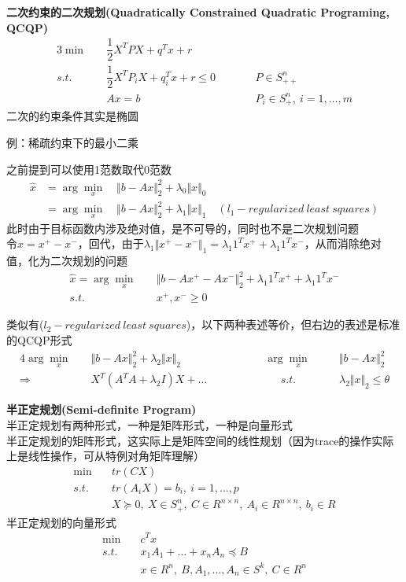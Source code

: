 \documentclass[11pt]{ctexart}         %
\newcommand{\rebacklinespread}[1][-12pt]{\vspace{#1}}
\newcommand{\oneline}[1][12pt]{\vspace{#1}}
\newcommand{\rs}[2][R]{#1^{#2}} %
\newcommand{\ba}[1]{\begin{align*}#1\end{align*}}
\newcommand{\li}[3][例]{
	#1：#2\\ 
	\phantom{#1：}\begin{minipage}[t]{0.9\linewidth}%
	\setlength\parskip{12pt}
	#3
	\end{minipage}
	\oneline}
\begin{document}
\textbf{二次约束的二次规划(Quadratically Constrained Quadratic Programing, QCQP)}
\rebacklinespread
\begin{alignat*}{3}
	\min\quad & \dfrac{1}{2}X^TPX+q^Tx+r&&\\
	s.t.\quad & \dfrac{1}{2}X^TP_iX+q_i^Tx+r\leq 0\qquad&&P\in S_{++}^n\\
			  &	 Ax=b					&&P_i\in S_+^n,\ i=1,\dots,m
\end{alignat*}
二次的约束条件其实是椭圆

\li{稀疏约束下的最小二乘}{
	之前提到可以使用1范数取代0范数
	\rebacklinespread
	\ba{\hat{x}&=\arg\min_x\quad \Vert b-Ax\Vert_2^2+\lambda_0\Vert x\Vert_0\\
			   &=\arg\min_x\quad \Vert b-Ax\Vert_2^2+\lambda_1\Vert x\Vert_1\quad (l_1-regularized\ least\ squares)}
	此时由于目标函数内涉及绝对值，是不可导的，同时也不是二次规划问题\\
	令$ x=x^+-x^- $，回代，由于$ \lambda_1\Vert x^+-x^-\Vert_1=\lambda_1 1^Tx^++\lambda_1 1^Tx^- $，从而消除绝对值，化为二次规划的问题
	\rebacklinespread
	\ba{\hat{x}=\arg\min_x\quad &\Vert b-Ax^+-Ax^-\Vert_2^2+\lambda_1 1^Tx^++\lambda_1 1^Tx^-\\s.t.\quad &x^+,x^-\geq 0}
}

类似有($ l_2-regularized\ least\ squares $)，以下两种表述等价，但右边的表述是标准的QCQP形式
\rebacklinespread
\begin{alignat*}{4}
	\arg\min_x\quad &\Vert b-Ax\Vert_2^2+\lambda_2\Vert x\Vert_2\hspace{6em}&&\arg\min_x\quad &&\Vert b-Ax\Vert_2^2\\
	\Rightarrow\quad &X^T(A^TA+\lambda_2I)X+\dots&&\phantom{arg} s.t.\quad&&\lambda_2\Vert x\Vert_2\leq \theta
\end{alignat*}

\newpage
\textbf{半正定规划(Semi-definite Program)}\\
半正定规划有两种形式，一种是矩阵形式，一种是向量形式\\
半正定规划的矩阵形式，这实际上是矩阵空间的线性规划（因为trace的操作实际上是线性操作，可从特例对角矩阵理解）
\rebacklinespread
\ba{\min\quad &tr(CX)\\s.t.\quad &tr(A_iX)=b_i,\ i=1,\dots,p\\&X\succeq0,\ X\in S_+^n,\ C\in R^{n\times n},\ A_i\in R^{n\times n},\ b_i\in R}
半正定规划的向量形式
\rebacklinespread
\ba{\min\quad &c^Tx\\s.t.\quad &x_1A_1+\dots+x_nA_n\preceq B\\&x\in \rs{n},\ B,A_1,\dots,A_n\in S^k,\ C\in R^n}
\end{document}
